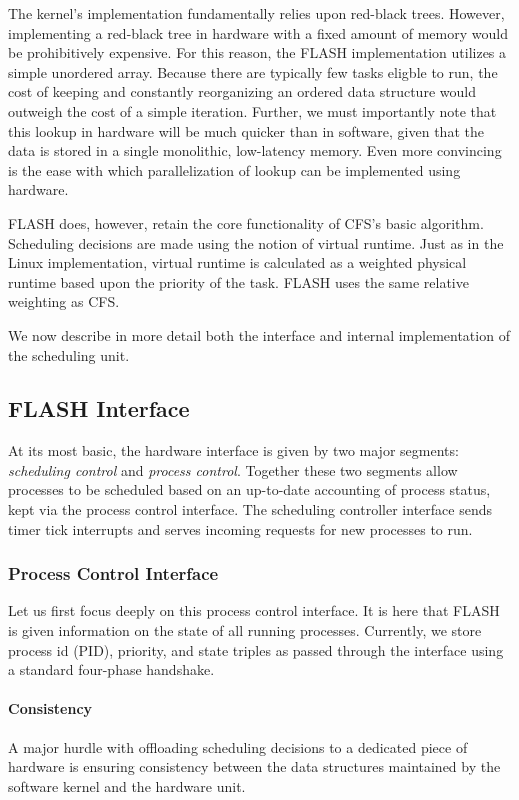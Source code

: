 \documentclass{sig-alternate-10pt}
\begin{document}
The kernel's implementation
fundamentally relies upon red-black trees. However, implementing a red-black tree in hardware with a fixed amount of
memory would be prohibitively expensive.  For this reason, the FLASH
implementation utilizes a simple unordered array.  Because there are
typically few tasks eligble to run, the cost of keeping and constantly reorganizing an
ordered data structure would outweigh the cost of a simple iteration.
Further, we must importantly note that this lookup in hardware will be much
quicker than in software, given that the data is stored in a single
monolithic, low-latency memory.  Even more convincing is the ease with which
parallelization of lookup can be implemented using hardware.

FLASH does, however, retain the core functionality of CFS's basic algorithm.
Scheduling decisions are made using the notion of virtual runtime.   Just as
in the Linux implementation, virtual runtime is calculated as a weighted
physical runtime based upon the priority of the task.  FLASH uses the same
relative weighting as CFS.

We now describe in more detail both the interface and internal
implementation of the scheduling unit.

\subsection{FLASH Interface}
At its most basic, the hardware interface is given by two major segments:
\emph{scheduling control} and \emph{process control}.  Together these two
segments allow processes to be scheduled based on an up-to-date accounting
of process status, kept via the process control interface.  The scheduling
controller interface sends timer tick interrupts and serves incoming
requests for new processes to run.

\subsubsection{Process Control Interface}
Let us first focus deeply on this process control interface.  It is here
that FLASH is given information on the state of all running
processes.  Currently, we store process id (PID), priority, and state
triples as passed through the interface using a standard four-phase
handshake.

\paragraph{Consistency} A major hurdle with offloading scheduling decisions
to a dedicated piece of hardware is ensuring consistency between the data
structures maintained by the software kernel and the
hardware unit.
\end{document}
